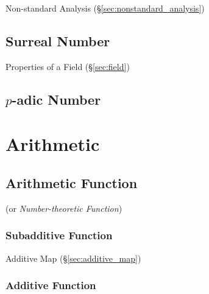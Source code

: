 Non-standard Analysis (\S\ref{sec:nonstandard_analysis})



\subsection{Surreal Number}\label{sec:surreal_number}

Properties of a Field (\S\ref{sec:field})



\subsection{$p$-adic Number}\label{sec:padic_number}



\section{Arithmetic}\label{sec:arithmetic}

\subsection{Arithmetic Function}\label{sec:arithmetic_function}

(or \emph{Number-theoretic Function})



\subsubsection{Subadditive Function}\label{sec:subadditive_function}

Additive Map (\S\ref{sec:additive_map})



\subsubsection{Additive Function}\label{sec:additive_function}


